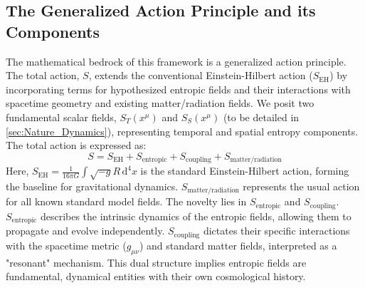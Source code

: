 \documentclass[11pt,a4paper]{article} %
\newcommand{\ST}{S_T}
\newcommand{\SSp}{S_S} %
\newcommand{\Scoupling}{S_{\text{coupling}}}
\newcommand{\SEH}{S_{\text{EH}}}
\newcommand{\Smatterradiation}{S_{\text{matter/radiation}}}
\newcommand{\Sentropic}{S_{\text{entropic}}}
\begin{document}
\subsection{The Generalized Action Principle and its Components}
The mathematical bedrock of this framework is a generalized action principle. The total action, $S$, extends the conventional Einstein-Hilbert action ($\SEH$)\cite{Einstein1916,Hilbert1915} by incorporating terms for hypothesized entropic fields and their interactions with spacetime geometry and existing matter/radiation fields. We posit two fundamental scalar fields, $\ST(x^\mu)$ and $\SSp(x^\mu)$ (to be detailed in \cref{sec:Nature_Dynamics}), representing temporal and spatial entropy components. The total action is expressed as:
\begin{equation}
\label{eq:total_action}
S=\SEH+\Sentropic+\Scoupling+\Smatterradiation
\end{equation}
Here, $\SEH=\frac{1}{16\pi G}\int\sqrt{-g}R\,\text{d}^4x$ is the standard Einstein-Hilbert action, forming the baseline for gravitational dynamics. $\Smatterradiation$ represents the usual action for all known standard model fields. The novelty lies in $\Sentropic$ and $\Scoupling$. $\Sentropic$ describes the intrinsic dynamics of the entropic fields, allowing them to propagate and evolve independently. $\Scoupling$ dictates their specific interactions with the spacetime metric ($g_{\mu\nu}$) and standard matter fields, interpreted as a "resonant" mechanism. This dual structure implies entropic fields are fundamental, dynamical entities with their own cosmological history.
\end{document}
